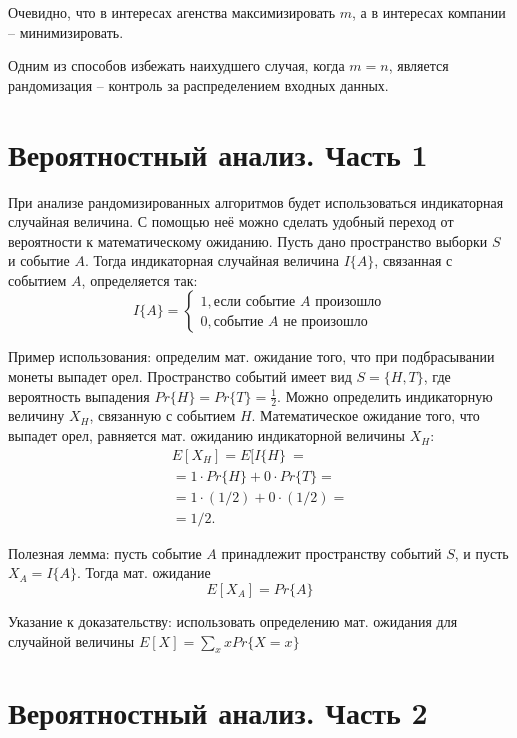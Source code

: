 \documentclass[11pt]{article}
\begin{document}
Очевидно, что в интересах агенства максимизировать $m$, а в интересах компании -- минимизировать.

Одним из способов избежать наихудшего случая, когда $m = n$, является рандомизация -- контроль
за распределением входных данных.

\section{Вероятностный анализ. Часть 1}

При анализе рандомизированных алгоритмов будет использоваться индикаторная случайная величина.
С помощью неё можно сделать удобный переход от вероятности к математическому ожиданию.
Пусть дано пространство выборки $S$ и событие $A$.
Тогда индикаторная случайная величина $I\{A\}$, связанная с событием $A$, определяется так:
\begin{equation*}
	I\{A\} = \begin{cases}
		1, \text{если событие $A$ произошло} \\
		0, \text{событие $A$ не произошло}
	\end{cases}
\end{equation*}

Пример использования: определим мат. ожидание того, что при подбрасывании монеты выпадет орел.
Пространство событий имеет вид $S = \{H, T\}$, где вероятность выпадения $Pr\{H\} = Pr\{T\} = \frac{1}{2}$.
Можно определить индикаторную величину $X_H$, связанную с событием $H$. Математическое ожидание того,
что выпадет орел, равняется мат. ожиданию индикаторной величины $X_H$:
\begin{align*}
	E[X_H] = E[I\{H\}\ = \\
	= 1 \cdot Pr\{H\} + 0 \cdot Pr\{T\} = \\
	= 1 \cdot (1/2) + 0 \cdot (1/2) = \\
	= 1/2.
\end{align*}

Полезная лемма: пусть событие $A$ принадлежит пространству событий $S$, и пусть $X_A = I\{A\}$. Тогда мат. ожидание
\begin{equation}
E[X_A] = Pr\{A\}
\end{equation}

Указание к доказательству: использовать определению мат. ожидания для случайной величины $E[X] = \sum_x x Pr \{X = x\}$

\section{Вероятностный анализ. Часть 2}
\end{document}
